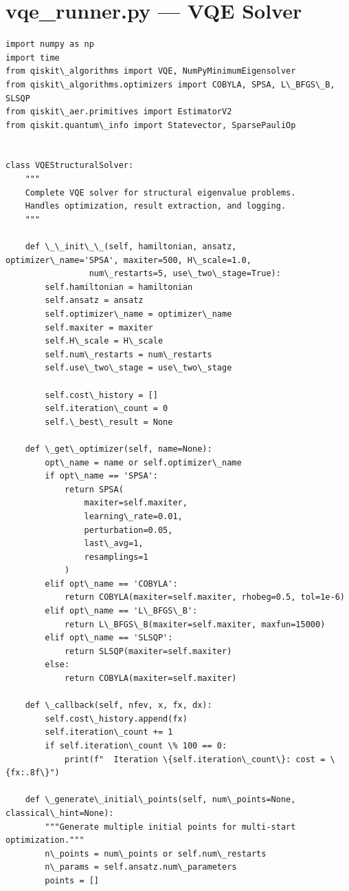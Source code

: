 \documentclass[12pt, a4paper]{article}
\begin{document}
\section{vqe_runner.py --- VQE Solver}
\begin{lstlisting}[style=codestyle, caption={{vqe_runner.py --- VQE Solver}}]
import numpy as np
import time
from qiskit\_algorithms import VQE, NumPyMinimumEigensolver
from qiskit\_algorithms.optimizers import COBYLA, SPSA, L\_BFGS\_B, SLSQP
from qiskit\_aer.primitives import EstimatorV2
from qiskit.quantum\_info import Statevector, SparsePauliOp


class VQEStructuralSolver:
    """
    Complete VQE solver for structural eigenvalue problems.
    Handles optimization, result extraction, and logging.
    """

    def \_\_init\_\_(self, hamiltonian, ansatz, optimizer\_name='SPSA', maxiter=500, H\_scale=1.0,
                 num\_restarts=5, use\_two\_stage=True):
        self.hamiltonian = hamiltonian
        self.ansatz = ansatz
        self.optimizer\_name = optimizer\_name
        self.maxiter = maxiter
        self.H\_scale = H\_scale
        self.num\_restarts = num\_restarts
        self.use\_two\_stage = use\_two\_stage

        self.cost\_history = []
        self.iteration\_count = 0
        self.\_best\_result = None

    def \_get\_optimizer(self, name=None):
        opt\_name = name or self.optimizer\_name
        if opt\_name == 'SPSA':
            return SPSA(
                maxiter=self.maxiter,
                learning\_rate=0.01,
                perturbation=0.05,
                last\_avg=1,
                resamplings=1
            )
        elif opt\_name == 'COBYLA':
            return COBYLA(maxiter=self.maxiter, rhobeg=0.5, tol=1e-6)
        elif opt\_name == 'L\_BFGS\_B':
            return L\_BFGS\_B(maxiter=self.maxiter, maxfun=15000)
        elif opt\_name == 'SLSQP':
            return SLSQP(maxiter=self.maxiter)
        else:
            return COBYLA(maxiter=self.maxiter)

    def \_callback(self, nfev, x, fx, dx):
        self.cost\_history.append(fx)
        self.iteration\_count += 1
        if self.iteration\_count \% 100 == 0:
            print(f"  Iteration \{self.iteration\_count\}: cost = \{fx:.8f\}")

    def \_generate\_initial\_points(self, num\_points=None, classical\_hint=None):
        """Generate multiple initial points for multi-start optimization."""
        n\_points = num\_points or self.num\_restarts
        n\_params = self.ansatz.num\_parameters
        points = []
        

\end{lstlisting}
\end{document}
